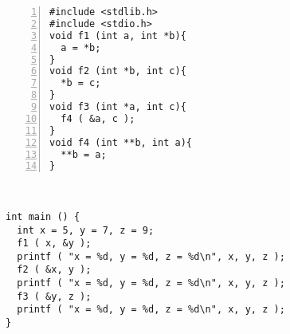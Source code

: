 \documentclass[10pt, sansserif,
               firstcolor=color1,
               secondcolor=color2,
               logo=logo-TN, 
               footband=bandeau-TN]{TelecomNancy}
\begin{document}

\vspace{2.5\baselineskip} 

\smallskip\noindent
  \begin{minipage}[t]{.3\linewidth}
  \begin{Verbatim}[label=Début du programme,numbers=left]
#include <stdlib.h>
#include <stdio.h>
void f1 (int a, int *b){
  a = *b;
}
void f2 (int *b, int c){
  *b = c;
}
void f3 (int *a, int c){
  f4 ( &a, c );
}
void f4 (int **b, int a){
  **b = a;
}
  \end{Verbatim}
  \end{minipage}~~~~~
  \begin{minipage}[t]{.6\linewidth}
  \begin{Verbatim}[label=Fin du programme,numbers=right,firstnumber=last]
int main () {
  int x = 5, y = 7, z = 9;
  f1 ( x, &y );
  printf ( "x = %d, y = %d, z = %d\n", x, y, z );
  f2 ( &x, y );
  printf ( "x = %d, y = %d, z = %d\n", x, y, z );
  f3 ( &y, z );
  printf ( "x = %d, y = %d, z = %d\n", x, y, z );
}    
  \end{Verbatim}    
  \vspace{-1.7\baselineskip}


  \end{minipage}

\end{document}
